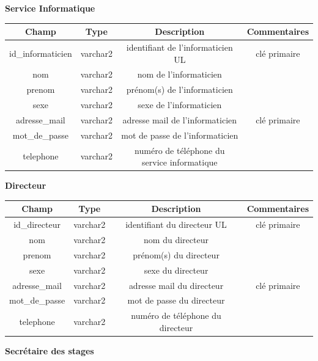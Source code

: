 \documentclass{scrreprt}
\begin{document}
\begin{center}
\vspace {1cm}
\textbf 
{Service Informatique}
\vspace {0,5cm}

\begin{tabular}{|c|c|c|c|}
  \hline
  \textbf {Champ} & \textbf {Type} & \textbf {Description} & \textbf {Commentaires} \\
  \hline
  id_informaticien & varchar2 & identifiant de l'informaticien UL & clé primaire\\
  \hline
  nom & varchar2 & nom de l'informaticien & \\
  \hline
  prenom & varchar2 & prénom(s) de l'informaticien &  \\
  \hline
  sexe & varchar2 & sexe de l'informaticien &  \\
  \hline
  adresse_mail & varchar2 & adresse mail de l'informaticien & clé primaire  \\
  \hline
  mot_de_passe & varchar2 & mot de passe de l'informaticien &  \\
  \hline
  telephone & varchar2 & numéro de téléphone du service informatique &  \\
  \hline
\end{tabular}

\vspace {2cm}
\textbf 
{Directeur}
\vspace {0,5cm}

\begin{tabular}{|c|c|c|c|}
  \hline
  \textbf {Champ} & \textbf {Type} & \textbf {Description} & \textbf {Commentaires} \\
  \hline
  id_directeur & varchar2 & identifiant du directeur UL & clé primaire\\
  \hline
  nom & varchar2 & nom du directeur & \\
  \hline
  prenom & varchar2 & prénom(s) du directeur &  \\
  \hline
  sexe & varchar2 & sexe du directeur &  \\
  \hline
  adresse_mail & varchar2 & adresse mail du directeur & clé primaire  \\
  \hline
  mot_de_passe & varchar2 & mot de passe du directeur &  \\
  \hline
  telephone & varchar2 & numéro de téléphone du directeur &  \\
  \hline
\end{tabular}

\vspace {1cm}
\textbf 
{Secrétaire des stages}
\vspace {0,5cm}


\end{center}
\end{document}
